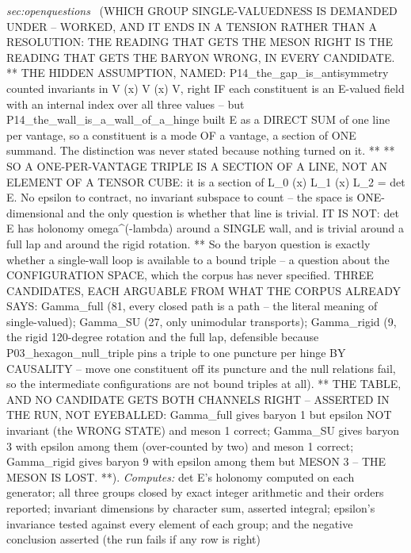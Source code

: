 \begin{description}
\textit{sec:openquestions} \ (WHICH GROUP SINGLE-VALUEDNESS IS DEMANDED UNDER -- WORKED, AND IT ENDS IN A TENSION RATHER THAN A RESOLUTION: THE READING THAT GETS THE MESON RIGHT IS THE READING THAT GETS THE BARYON WRONG, IN EVERY CANDIDATE. ** THE HIDDEN ASSUMPTION, NAMED: P14\_the\_gap\_is\_antisymmetry counted invariants in V (x) V (x) V, right IF each constituent is an E-valued field with an internal index over all three values -- but P14\_the\_wall\_is\_a\_wall\_of\_a\_hinge built E as a DIRECT SUM of one line per vantage, so a constituent is a mode OF a vantage, a section of ONE summand. The distinction was never stated because nothing turned on it. ** ** SO A ONE-PER-VANTAGE TRIPLE IS A SECTION OF A LINE, NOT AN ELEMENT OF A TENSOR CUBE: it is a section of L\_0 (x) L\_1 (x) L\_2 = det E. No epsilon to contract, no invariant subspace to count -- the space is ONE-dimensional and the only question is whether that line is trivial. IT IS NOT: det E has holonomy omega\textasciicircum{}(-lambda) around a SINGLE wall, and is trivial around a full lap and around the rigid rotation. ** So the baryon question is exactly whether a single-wall loop is available to a bound triple -- a question about the CONFIGURATION SPACE, which the corpus has never specified. THREE CANDIDATES, EACH ARGUABLE FROM WHAT THE CORPUS ALREADY SAYS: Gamma\_full (81, every closed path is a path -- the literal meaning of single-valued); Gamma\_SU (27, only unimodular transports); Gamma\_rigid (9, the rigid 120-degree rotation and the full lap, defensible because P03\_hexagon\_null\_triple pins a triple to one puncture per hinge BY CAUSALITY -- move one constituent off its puncture and the null relations fail, so the intermediate configurations are not bound triples at all). ** THE TABLE, AND NO CANDIDATE GETS BOTH CHANNELS RIGHT -- ASSERTED IN THE RUN, NOT EYEBALLED: Gamma\_full gives baryon 1 but epsilon NOT invariant (the WRONG STATE) and meson 1 correct; Gamma\_SU gives baryon 3 with epsilon among them (over-counted by two) and meson 1 correct; Gamma\_rigid gives baryon 9 with epsilon among them but MESON 3 -- THE MESON IS LOST. **). 
\emph{Computes:} det E's holonomy computed on each generator; all three groups closed by exact integer arithmetic and their orders reported; invariant dimensions by character sum, asserted integral; epsilon's invariance tested against every element of each group; and the negative conclusion asserted (the run fails if any row is right)

\end{description}
